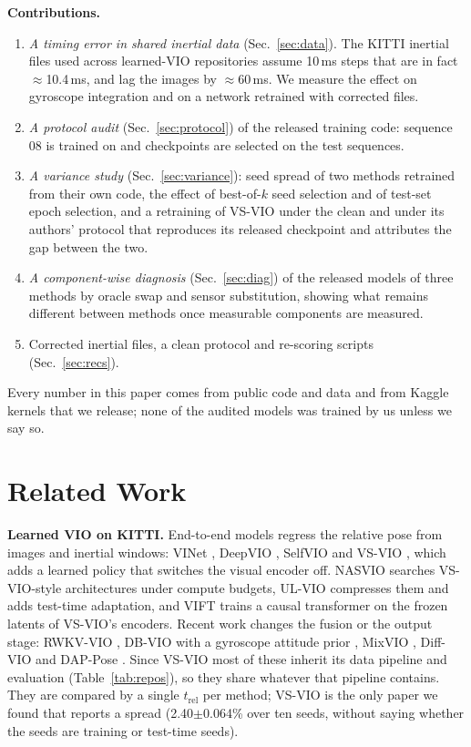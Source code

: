 \documentclass[letterpaper,journal]{IEEEtran}
\newcommand{\trel}{t_{\mathrm{rel}}}
\begin{document}
\textbf{Contributions.}
\begin{enumerate}
\item \emph{A timing error in shared inertial data} (Sec.~\ref{sec:data}). The KITTI inertial files used across learned-VIO repositories assume 10\,ms steps that are in fact $\approx$10.4\,ms, and lag the images by $\approx$60\,ms. We measure the effect on gyroscope integration and on a network retrained with corrected files.
\item \emph{A protocol audit} (Sec.~\ref{sec:protocol}) of the released training code: sequence 08 is trained on and checkpoints are selected on the test sequences.
\item \emph{A variance study} (Sec.~\ref{sec:variance}): seed spread of two methods retrained from their own code, the effect of best-of-$k$ seed selection and of test-set epoch selection, and a retraining of VS-VIO under the clean and under its authors' protocol that reproduces its released checkpoint and attributes the gap between the two.
\item \emph{A component-wise diagnosis} (Sec.~\ref{sec:diag}) of the released models of three methods by oracle swap and sensor substitution, showing what remains different between methods once measurable components are measured.
\item Corrected inertial files, a clean protocol and re-scoring scripts (Sec.~\ref{sec:recs}).
\end{enumerate}
Every number in this paper comes from public code and data and from Kaggle kernels that we release; none of the audited models was trained by us unless we say so.

\section{Related Work}
\label{sec:related}

\textbf{Learned VIO on KITTI.} End-to-end models regress the relative pose from images and inertial windows: VINet \cite{Clark2017}, DeepVIO \cite{Han2019}, SelfVIO \cite{Almalioglu2022} and VS-VIO \cite{Yang2022}, which adds a learned policy that switches the visual encoder off. NASVIO \cite{Chen2023NASVIO} searches VS-VIO-style architectures under compute budgets, UL-VIO \cite{Park2024ULVIO} compresses them and adds test-time adaptation, and VIFT \cite{Kurt2024} trains a causal transformer on the frozen latents of VS-VIO's encoders. Recent work changes the fusion or the output stage: RWKV-VIO \cite{RWKVVIO2025}, DB-VIO with a gyroscope attitude prior \cite{Wan2026}, MixVIO \cite{Ma2026}, Diff-VIO \cite{Qin2026} and DAP-Pose \cite{DAPPose}. Since VS-VIO most of these inherit its data pipeline and evaluation (Table~\ref{tab:repos}), so they share whatever that pipeline contains. They are compared by a single $\trel$ per method; VS-VIO is the only paper we found that reports a spread (2.40$\pm$0.064\% over ten seeds, without saying whether the seeds are training or test-time seeds).
\end{document}
